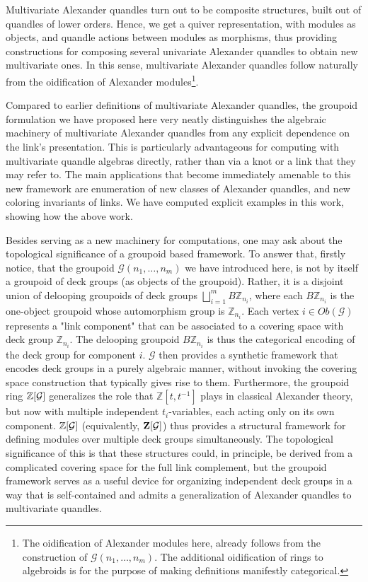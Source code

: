 \documentclass[a4paper,12pt]{article}
\newcommand{\Z}{\mathbb{Z}}
\newcommand{\Zb}{\mathbf{Z}}
\newcommand{\calG}{\mathcal{G}}
\begin{document}
Multivariate Alexander quandles turn out to be composite structures, built out of quandles of lower orders. Hence, we get a quiver representation, with modules as objects, and quandle actions between modules as morphisms, thus providing constructions for composing several univariate Alexander quandles to obtain new multivariate ones. In this sense, multivariate Alexander quandles  follow naturally from the oidification of Alexander modules\footnote{The oidification of Alexander modules here, already follows from the construction of $\calG (n_1, \ldots, n_m)$. The additional oidification of rings to algebroids is   for the purpose of making definitions manifestly categorical.}.  

Compared to earlier definitions of multivariate Alexander quandles, the groupoid formulation we have proposed here very neatly distinguishes the algebraic machinery of multivariate Alexander quandles from any explicit dependence on the link's presentation. This is particularly advantageous for computing with multivariate quandle algebras directly, rather than via a knot or a link that they may refer to. The main applications  that become immediately amenable to this new framework are enumeration of  new classes of Alexander quandles, and new coloring invariants of links. We have computed explicit examples in this work, showing how the above work.  

Besides serving as a new machinery for computations, one may ask about the topological significance of a groupoid based framework. To answer that, firstly notice, that the groupoid $\calG (n_1, \ldots, n_m)$  we have introduced here, is not by itself a groupoid of deck groups (as objects of the groupoid). Rather, it is a disjoint union of delooping groupoids of deck groups $\bigsqcup_{i=1}^{m} B\Z_{n_i}$, where each $B\Z_{n_i}$ is the one-object groupoid whose automorphism group is $\Z_{n_i}$. Each vertex $i \in Ob({\calG})$ represents a "link component" that can be associated to a  covering space with deck group $\Z_{n_i}$. The delooping groupoid $B\Z_{n_i}$ is thus the categorical encoding of the deck group for component $i$.  $\calG$ then provides a synthetic framework that encodes deck groups in a purely algebraic manner, without invoking the covering space construction that typically gives rise to them. Furthermore, the groupoid ring $\Z[{\cal G}]$  generalizes the role that $\Z[t, t^{-1}]$  plays in classical Alexander theory, but now with multiple independent $t_i$-variables, each acting only on its own component. $\Z[{\cal G}]$ (equivalently, $\Zb[{\cal G}]$) thus provides a structural framework for defining modules over multiple deck groups simultaneously. The topological significance of this is that these structures could, in principle, be derived from a complicated covering space for the full link complement, but the groupoid framework serves as a useful device for organizing independent deck groups in a way that is self-contained and admits a generalization of Alexander quandles to multivariate quandles. 
\end{document}
